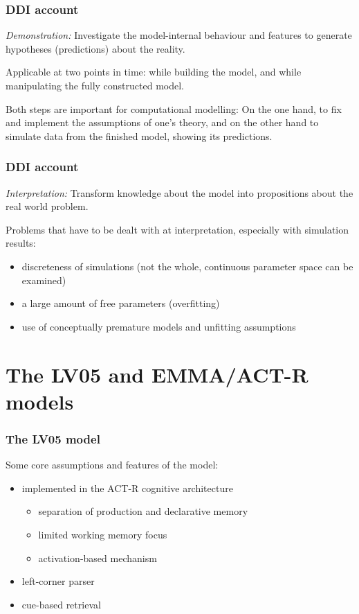 \documentclass{beamer}
\begin{document}
\begin{frame}
  \frametitle{DDI account}

  \emph{Demonstration:} Investigate the model-internal behaviour and features to generate hypotheses (predictions)
  about the reality. 
  
  Applicable at two points in time: while building the model, and while manipulating the fully constructed model.

  Both steps are important for computational modelling: On the one hand, to fix and implement the assumptions of one's
  theory, and on the other hand to simulate data from the finished model, showing its predictions.
\end{frame}

\begin{frame}
  \frametitle{DDI account}

  \emph{Interpretation:} Transform knowledge about the model into propositions about the real world problem.
  
  Problems that have to be dealt with at interpretation, especially with simulation results:

  \begin{itemize}
    \item discreteness of simulations (not the whole, continuous parameter space can be examined)
    \item a large amount of free parameters (overfitting)
    \item use of conceptually premature models and unfitting assumptions
  \end{itemize}
\end{frame}

\section{The LV05 and EMMA/ACT-R models}

\begin{frame}
  \frametitle{The LV05 model}
   
  Some core assumptions and features of the model:

  \begin{itemize}
    \item implemented in the ACT-R cognitive architecture
      \begin{itemize}
        \item separation of production and declarative memory
        \item limited working memory focus
        \item activation-based mechanism
      \end{itemize}
    \item left-corner parser
    \item cue-based retrieval
  \end{itemize}
\end{frame}
\end{document}
